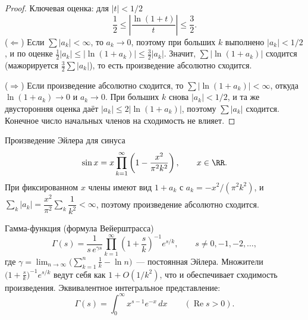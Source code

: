\begin{proof}
	Ключевая оценка: для $|t| < 1/2$
	\[
	\frac{1}{2} \le \left| \frac{\ln(1 + t)}{t} \right| \le \frac{3}{2}.
	\]
	($\Leftarrow$) Если $\sum |a_k| < \infty$, то $a_k \to 0$, поэтому при больших $k$ выполнено $|a_k| < 1/2$, и по оценке $\tfrac12 |a_k| \le |\ln(1 + a_k)| \le \tfrac32 |a_k|$. Значит, $\sum |\ln(1 + a_k)|$ сходится (мажорируется $\tfrac32 \sum |a_k|$), то есть произведение абсолютно сходится.

	($\Rightarrow$) Если произведение абсолютно сходится, то $\sum |\ln(1 + a_k)| < \infty$, откуда $\ln(1 + a_k) \to 0$ и $a_k \to 0$. При больших $k$ снова $|a_k| < 1/2$, и та же двусторонняя оценка даёт $|a_k| \le 2|\ln(1 + a_k)|$, поэтому $\sum |a_k|$ сходится. Конечное число начальных членов на сходимость не влияет.
\end{proof}

\begin{Example}{Произведение Эйлера для синуса}{}
	\[
	\sin x = x \prod_{k=1}^{\infty} \left( 1 - \frac{x^2}{\pi^2 k^2} \right), \qquad x \in \RR.
	\]
	При фиксированном $x$ члены имеют вид $1 + a_k$ с $a_k = -x^2/(\pi^2 k^2)$, и $\sum_k |a_k| = \dfrac{x^2}{\pi^2}\sum_k \dfrac{1}{k^2} < \infty$, поэтому произведение абсолютно сходится.
\end{Example}

\begin{Example}{Гамма-функция (формула Вейерштрасса)}{}
	\[
	\Gamma(s) = \frac{1}{s\, e^{\gamma s}} \prod_{k=1}^{\infty} \left( 1 + \frac{s}{k} \right)^{-1} e^{s/k}, \qquad s \neq 0, -1, -2, \ldots,
	\]
	где $\gamma = \lim_{n \to \infty}\bigl( \sum_{k=1}^{n} \tfrac{1}{k} - \ln n \bigr)$~--- постоянная Эйлера. Множители $\bigl(1 + \tfrac{s}{k}\bigr)^{-1} e^{s/k}$ ведут себя как $1 + O(1/k^2)$, что и обеспечивает сходимость произведения. Эквивалентное интегральное представление:
	\[
	\Gamma(s) = \int_0^{\infty} x^{s-1} e^{-x}\,dx \qquad (\operatorname{Re} s > 0).
	\]
\end{Example}
